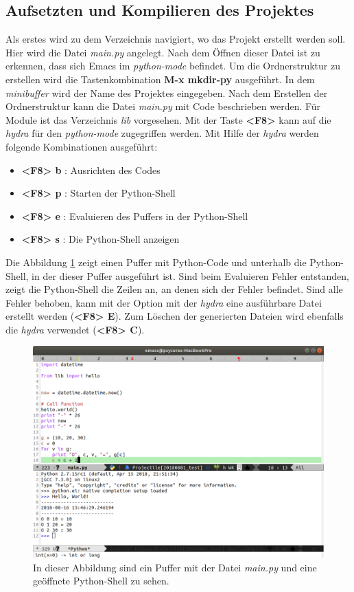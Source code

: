 \subsection{Aufsetzten und Kompilieren des Projektes}
\label{subsec:projpython}
Als erstes wird zu dem Verzeichnis navigiert, wo das Projekt erstellt
werden soll. Hier wird die Datei \textit{main.py} angelegt. Nach dem
Öffnen dieser Datei ist zu erkennen, dass sich Emacs im
\textit{python-mode} befindet. Um die Ordnerstruktur zu erstellen wird
die Tastenkombination \textbf{M-x mkdir-py} ausgeführt. In dem
\textit{minibuffer} wird der Name des Projektes eingegeben. Nach dem
Erstellen der Ordnerstruktur kann die Datei \textit{main.py} mit Code
beschrieben werden. Für Module ist das Verzeichnis \textit{lib}
vorgesehen. Mit der Taste \textbf{<F8>} kann auf die \textit{hydra}
für den \textit{python-mode} zugegriffen werden. Mit Hilfe der
\textit{hydra} werden folgende Kombinationen ausgeführt:
\begin{itemize}
\item \textbf{<F8> b} : Ausrichten des Codes
\item \textbf{<F8> p} : Starten der Python-Shell
\item \textbf{<F8> e} : Evaluieren des Puffers in der Python-Shell
\item \textbf{<F8> s} : Die Python-Shell anzeigen\\
\end{itemize}
Die Abbildung \ref{fig:python} zeigt einen Puffer mit Python-Code und
unterhalb die Python-Shell, in der dieser Puffer ausgeführt ist. Sind
beim Evaluieren Fehler entstanden, zeigt die Python-Shell die Zeilen
an, an denen sich der Fehler befindet. Sind alle Fehler behoben, kann
mit der Option mit der \textit{hydra} eine ausführbare Datei erstellt
werden (\textbf{<F8> E}). Zum Löschen der generierten Dateien wird
ebenfalls die \textit{hydra} verwendet (\textbf{<F8> C}).\\

\begin{figure}[H]
  \centering
  \includegraphics[width=.95\textwidth]{./images/Workflow/pythonshell.png}
  \caption{\label{fig:python} In dieser Abbildung sind ein Puffer mit
    der Datei \textit{main.py} und eine geöffnete Python-Shell zu
    sehen.}
\end{figure}

